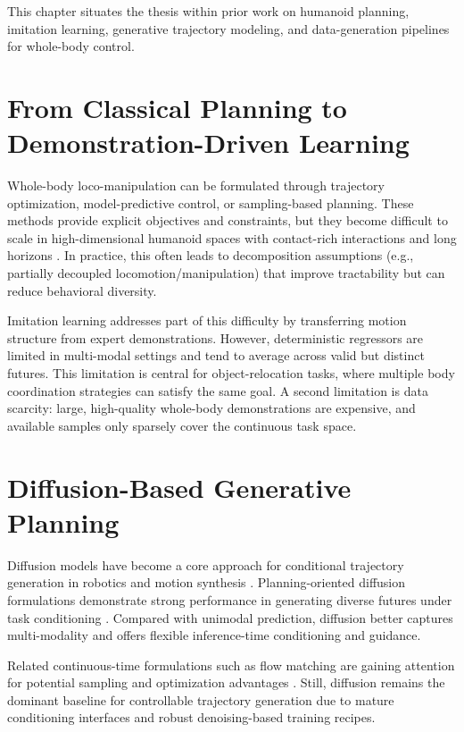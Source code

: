 This chapter situates the thesis within prior work on humanoid planning, imitation learning, generative trajectory modeling, and data-generation pipelines for whole-body control.

\section{From Classical Planning to Demonstration-Driven Learning}

Whole-body loco-manipulation can be formulated through trajectory optimization, model-predictive control, or sampling-based planning. These methods provide explicit objectives and constraints, but they become difficult to scale in high-dimensional humanoid spaces with contact-rich interactions and long horizons \cite{gu2025humanoidlocomotionmanipulationcurrent}. In practice, this often leads to decomposition assumptions (e.g., partially decoupled locomotion/manipulation) that improve tractability but can reduce behavioral diversity.

Imitation learning addresses part of this difficulty by transferring motion structure from expert demonstrations. However, deterministic regressors are limited in multi-modal settings and tend to average across valid but distinct futures. This limitation is central for object-relocation tasks, where multiple body coordination strategies can satisfy the same goal. A second limitation is data scarcity: large, high-quality whole-body demonstrations are expensive, and available samples only sparsely cover the continuous task space.

\section{Diffusion-Based Generative Planning}

Diffusion models have become a core approach for conditional trajectory generation in robotics and motion synthesis \cite{wolf2025diffusion}. Planning-oriented diffusion formulations demonstrate strong performance in generating diverse futures under task conditioning \cite{janner2022diffuser,carvalho2023motion,chi2023diffusion}. Compared with unimodal prediction, diffusion better captures multi-modality and offers flexible inference-time conditioning and guidance.

Related continuous-time formulations such as flow matching are gaining attention for potential sampling and optimization advantages \cite{rouxel2024flow}. Still, diffusion remains the dominant baseline for controllable trajectory generation due to mature conditioning interfaces and robust denoising-based training recipes.

